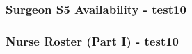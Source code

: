 % 

% 


\begin{frame}[fragile]
\frametitle{Surgeon S5 Availability - test10}
\scalebox{0.6}{

}
\end{frame}


\begin{frame}[fragile]
\frametitle{Nurse Roster (Part I) - test10}
\scalebox{0.6}{

}
\end{frame}

